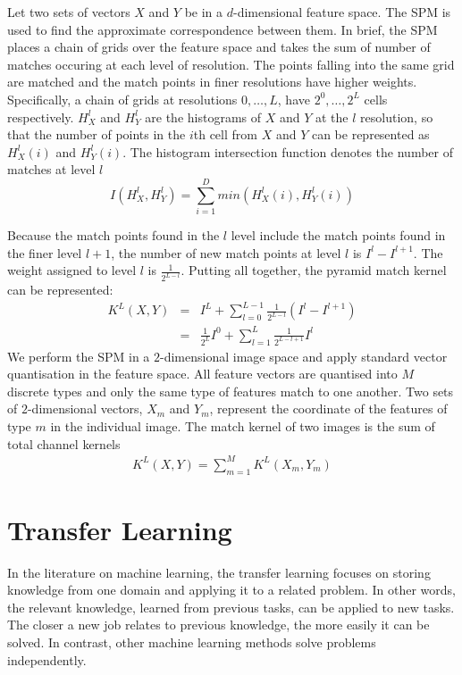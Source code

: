 Let two sets of vectors $X$ and $Y$ be in a $d$-dimensional feature space. The SPM is used to find the approximate correspondence between them. In brief, the SPM places a chain of grids over the feature space and takes the sum of number of matches occuring at each level of resolution. The points falling into the same grid are matched and the match points in finer resolutions have higher weights. Specifically, a chain of grids at resolutions $0,\dotso,L$, have $2^0,\dotso,2^L$ cells respectively. $H_{X}^l$ and $H_{Y}^l$ are the histograms of $X$ and $Y$ at the $l$ resolution, so that the number of points in the $i$th cell from $X$ and $Y$ can be represented as $H_{X}^l(i)$ and $H_{Y}^l(i)$. The histogram intersection function denotes the number of matches at level $l$
\begin{equation}\label{eq:HistInterFunc}
I(H_{X}^l, H_{Y}^l) = \sum_{i=1}^D min(H_{X}^l(i), H_{Y}^l(i))
\end{equation}

Because the match points found in the $l$ level include the match points found in the finer level $l+1$, the number of new match points at level $l$ is $I^l - I^{l+1}$. The weight assigned to level $l$ is $\frac{1}{2^{L-l}}$. Putting all together, the pyramid match kernel can be represented:
\begin{eqnarray}\label{eq:PyramidChanMatchKernel}
  K^L(X,Y) & = & I^L + \sum_{l=0}^{L-1} \frac{1}{2^{L-l}}(I^l-I^{l+1})\\
 & = & \frac{1}{2^L}I^0 + \sum_{l=1}^{L}\frac{1}{2^{L-l+1}}I^l
\end{eqnarray}
We perform the SPM in a $2$-dimensional image space and apply standard vector quantisation in the feature space. All feature vectors are quantised into $M$ discrete types and only the same type of features match to one another. Two sets of $2$-dimensional vectors, $X_m$ and $Y_m$, represent the coordinate of the features of type $m$ in the individual image. The match kernel of two images is the sum of total channel kernels
\begin{eqnarray}\label{eq:PyramidMatchKernel}
  K^L(X,Y) = \sum_{m=1}^{M} K^L(X_m, Y_m)
\end{eqnarray}

\section{Transfer Learning}

In the literature on machine learning, the transfer learning \citep{pan2010survey} focuses on storing knowledge from one domain and applying it to a related problem. In other words, the relevant knowledge, learned from previous tasks, can be applied to new tasks. The closer a new job relates to previous knowledge, the more easily it can be solved. In contrast, other machine learning methods solve problems independently. 


